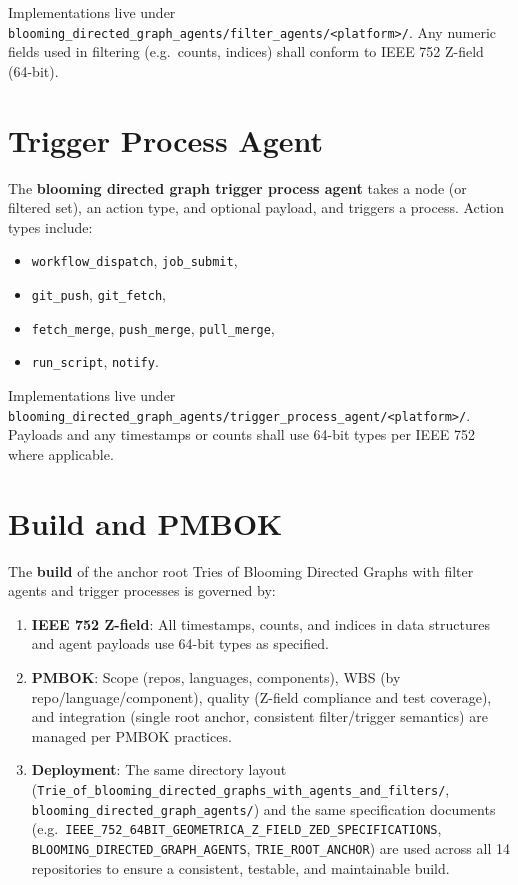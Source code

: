 Implementations live under \texttt{blooming\_directed\_graph\_agents/filter\_agents/<platform>/}. Any numeric fields used in filtering (e.g.\ counts, indices) shall conform to IEEE 752 Z-field (64-bit).

\section{Trigger Process Agent}

The \textbf{blooming directed graph trigger process agent} takes a node (or filtered set), an action type, and optional payload, and triggers a process. Action types include:

\begin{itemize}
    \item \texttt{workflow\_dispatch}, \texttt{job\_submit},
    \item \texttt{git\_push}, \texttt{git\_fetch},
    \item \texttt{fetch\_merge}, \texttt{push\_merge}, \texttt{pull\_merge},
    \item \texttt{run\_script}, \texttt{notify}.
\end{itemize}

Implementations live under \texttt{blooming\_directed\_graph\_agents/trigger\_process\_agent/<platform>/}. Payloads and any timestamps or counts shall use 64-bit types per IEEE 752 where applicable.

\section{Build and PMBOK}

The \textbf{build} of the anchor root Tries of Blooming Directed Graphs with filter agents and trigger processes is governed by:

\begin{enumerate}
    \item \textbf{IEEE 752 Z-field}: All timestamps, counts, and indices in data structures and agent payloads use 64-bit types as specified.
    \item \textbf{PMBOK}: Scope (repos, languages, components), WBS (by repo/language/component), quality (Z-field compliance and test coverage), and integration (single root anchor, consistent filter/trigger semantics) are managed per PMBOK practices.
    \item \textbf{Deployment}: The same directory layout (\texttt{Trie\_of\_blooming\_directed\_graphs\_with\_agents\_and\_filters/}, \texttt{blooming\_directed\_graph\_agents/}) and the same specification documents (e.g.\ \texttt{IEEE\_752\_64BIT\_GEOMETRICA\_Z\_FIELD\_ZED\_SPECIFICATIONS}, \texttt{BLOOMING\_DIRECTED\_GRAPH\_AGENTS}, \texttt{TRIE\_ROOT\_ANCHOR}) are used across all 14 repositories to ensure a consistent, testable, and maintainable build.
\end{enumerate}
